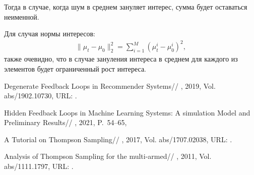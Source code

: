\documentclass[12pt, twoside]{article}
\begin{document}
Тогда в случае, когда шум в среднем зануляет интерес, сумма будет оставаться неименной.  

Для случая нормы интересов: 
\begin{gather*}
  \|\mu_t - \mu_0 \|^2_2 = \sum_{i=1}^M (\mu_t^i - \mu_0^i)^2,
\end{gather*}
также очевидно, что в случае зануления интереса в среднем для каждого из элементов будет ограниченный рост интереса.
\begin{thebibliography}{99}
    Degenerate Feedback Loops in Recommender Systems//
    , 2019, Vol. abs/1902.10730,
	  URL: .

    Hidden Feedback Loops in Machine Learning Systems: A simulation Model and Preliminary Results//
    , 2021, P.~54--65,

    A Tutorial on Thompson Sampling//
    , 2017, Vol. abs/1707.02038,
	  URL: .

    Analysis of Thompson Sampling for the multi-armed//
    , 2011, Vol. abs/1111.1797,
	  URL: .
\end{thebibliography}

\end{document}
